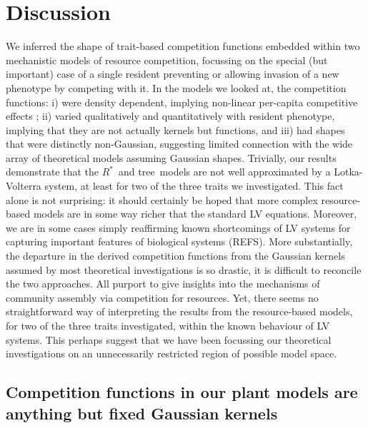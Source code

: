 \documentclass[a4paper,11pt]{article}
\newcommand{\Rstar}{\ensuremath{R^*}}
\newcommand{\TREE}{{\sc tree}}
\begin{document}
\clearpage
\section{Discussion}

We inferred the shape of trait-based competition functions embedded within
two mechanistic models of resource competition, focussing on the special (but
important) case of a single resident preventing or allowing invasion of a new
phenotype by competing with it. In the models we looked at, the competition
functions: i) were density dependent, implying non-linear per-capita
competitive effects \citep{Abrams-1980}; ii) varied qualitatively and
quantitatively with resident phenotype, implying that they are not actually
kernels but functions, and iii) had shapes that were distinctly non-Gaussian,
suggesting limited connection with the wide array of theoretical models
assuming Gaussian shapes. Trivially, our results demonstrate that the \Rstar\
and \TREE\  models are not well approximated by a Lotka-Volterra system, at
least for two of the three traits we investigated. This fact alone is not
surprising: it should certainly be hoped that more complex resource-based models
are in some way richer that the standard LV equations. Moreover, we are in
some cases simply reaffirming known shortcomings of LV systems for capturing
important features of biological systems (REFS). More substantially, the
departure in the derived competition functions from the Gaussian kernels
assumed by most theoretical investigations is so drastic, it is difficult to
reconcile the two approaches. All purport to give insights into the mechanisms
of community assembly via competition for resources. Yet, there seems no
straightforward way of interpreting the results from the resource-based
models, for two of the three traits investigated, within the known behaviour
of LV systems. This perhaps suggest that we have been focussing our
theoretical investigations on an unnecessarily restricted region of possible
model space.

\subsection{Competition functions in our plant models are anything but fixed 
Gaussian kernels}
\end{document}
